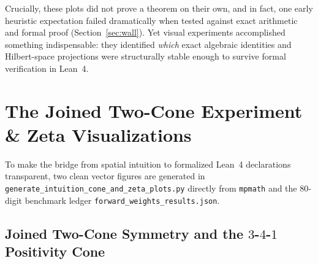 \documentclass[11pt,a4paper]{article}
\begin{document}
Crucially, these plots did not prove a theorem on their own, and in fact, one early heuristic expectation failed dramatically when tested against exact arithmetic and formal proof (Section~\ref{sec:wall}). Yet visual experiments accomplished something indispensable: they identified \emph{which} exact algebraic identities and Hilbert-space projections were structurally stable enough to survive formal verification in Lean~4.

\section{The Joined Two-Cone Experiment \& Zeta Visualizations}\label{sec:cones}

To make the bridge from spatial intuition to formalized Lean~4 declarations transparent, two clean vector figures are generated in \texttt{generate\_\allowbreak intuition\_\allowbreak cone\_\allowbreak and\_\allowbreak zeta\_\allowbreak plots.py} directly from \texttt{mpmath} and the $80$-digit benchmark ledger \texttt{forward\_\allowbreak weights\_\allowbreak results.json}.

\subsection{Joined Two-Cone Symmetry and the $3$-$4$-$1$ Positivity Cone}
\end{document}
